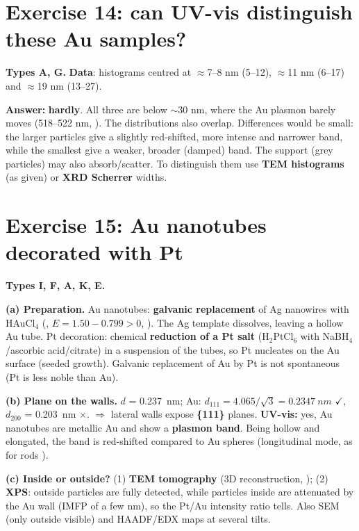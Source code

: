 \section{Exercise 14: can UV-vis distinguish these Au samples?}
\textbf{Types A, G.} \textbf{Data}\readoff: histograms centred at $\approx$7--8 nm (5--12), $\approx$11 nm (6--17) and
$\approx$19 nm (13--27).

\textbf{Answer:} \textbf{hardly}. All three are below $\sim$30 nm, where the Au plasmon barely moves (518--522 nm,
). The distributions also overlap. Differences would be small: the larger particles give a slightly
red-shifted, more intense and narrower band, while the smallest give a weaker, broader (damped) band. The support
(grey particles) may also absorb/scatter. To distinguish them use \textbf{TEM histograms} (as given) or \textbf{XRD Scherrer}
widths.

\section{Exercise 15: Au nanotubes decorated with Pt}
\textbf{Types I, F, A, K, E.}

\textbf{(a) Preparation.} Au nanotubes: \textbf{galvanic replacement} of Ag nanowires with HAuCl$_4$
(, $E = 1.50 - 0.799 > 0$, ). The Ag template dissolves, leaving a hollow Au tube.
Pt decoration: chemical \textbf{reduction of a Pt salt} (H$_2$PtCl$_6$ with NaBH$_4$/ascorbic acid/citrate) in a suspension
of the tubes, so Pt nucleates on the Au surface (seeded growth). Galvanic replacement of Au by Pt is not spontaneous (Pt is
less noble than Au)\extra.

\textbf{(b) Plane on the walls.} $d$ = \SI{0.237}{nm}; Au: $d_{111} = 4.065/\sqrt3 = \SI{0.2347}{nm}$ $\checkmark$,
$d_{200}$ = \SI{0.203}{nm} $\times$. $\Rightarrow$ lateral walls expose \textbf{\{111\}} planes.
\textbf{UV-vis:} yes, Au nanotubes are metallic Au and show a \textbf{plasmon band}. Being hollow and elongated, the band is
red-shifted compared to Au spheres (longitudinal mode, as for rods )\extra.

\textbf{(c) Inside or outside?} (1) \textbf{TEM tomography} (3D reconstruction, ); (2) \textbf{XPS}: outside particles
are fully detected, while particles inside are attenuated by the Au wall (IMFP of a few nm), so the Pt/Au intensity ratio
tells. Also SEM (only outside visible) and HAADF/EDX maps at several tilts.

